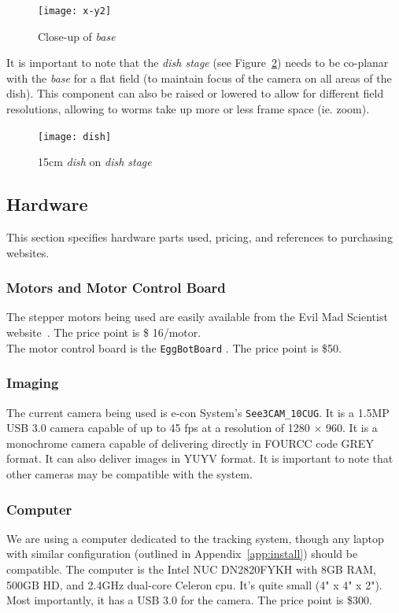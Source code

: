 \documentclass[main.tex]{subfiles}
\begin{document}
\begin{figure}[!htbp]
\centering
\texttt{[image: x-y2]}
\caption{Close-up of \textit{base}}
\label{fig:x-y}
\end{figure}




It is important to note that the \textit{dish stage} (see Figure~\ref{fig:dish})  needs to be co-planar with the \textit{base} for a flat field (to maintain focus of the camera on all areas of the dish). This component can also be raised or lowered to allow for different field resolutions, allowing to worms take up more or less frame space (ie. zoom). \\ %
\begin{figure}[!htbp]
  \centering
  \texttt{[image: dish]}
  \caption{15cm \textit{dish} on \textit{dish stage}}
  \label{fig:dish}
\end{figure}



\subsection{Hardware}
This section specifies hardware parts used, pricing, and references to purchasing websites.
\subsubsection{Motors and Motor Control Board}
The stepper motors being used are easily available from the Evil Mad Scientist website~\cite{EvilMadmotor}. The price point is \$ 16/motor.\\

The motor control board is the \verb|EggBotBoard| \cite{EvilMadEBB}. The price point is \$50. 

\subsubsection{Imaging}
The current camera being used is e-con System's \verb|See3CAM_10CUG|. \cite{EconCam} It is a 1.5MP USB 3.0 camera capable of up to 45 fps at a resolution of 1280 $\times$ 960. It is a monochrome camera capable of delivering directly in FOURCC code GREY format. It can also deliver images in YUYV format. It is important to note that other cameras may be compatible with the system.

\subsubsection{Computer}
We are using a computer dedicated to the tracking system, though any laptop with similar configuration (outlined in Appendix~\ref{app:install}) should be compatible. The computer is the Intel NUC DN2820FYKH \cite{NUC} with 8GB RAM, 500GB HD, and 2.4GHz dual-core Celeron cpu. It's quite small (4" x 4" x 2"). Most importantly, it has a USB 3.0 for the camera. The price point is \$300.\\
\end{document}
